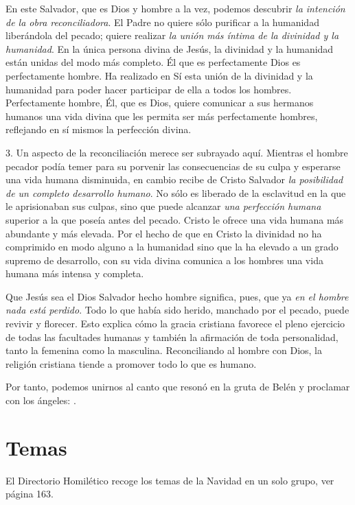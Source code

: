 \begin{body}
\begin{body}
En este Salvador, que es Dios y hombre a la vez, podemos descubrir \emph{la intención de la obra reconciliadora}. El Padre no quiere sólo purificar a la humanidad liberándola del pecado; quiere realizar \emph{la unión más íntima de la divinidad y la humanidad}. En la única persona divina de Jesús, la divinidad y la humanidad están unidas del modo más completo. Él que es perfectamente Dios es perfectamente hombre. Ha realizado en Sí esta unión de la divinidad y la humanidad para poder hacer participar de ella a todos los hombres. Perfectamente hombre, Él, que es Dios, quiere comunicar a sus hermanos humanos una vida divina que les permita ser más perfectamente hombres, reflejando en sí mismos la perfección divina.

3. Un aspecto de la reconciliación merece ser subrayado aquí. Mientras el hombre pecador podía temer para su porvenir las consecuencias de su culpa y esperarse una vida humana disminuida, en cambio recibe de Cristo Salvador \emph{la posibilidad de un completo desarrollo humano}. No sólo es liberado de la esclavitud en la que le aprisionaban sus culpas, sino que puede alcanzar \emph{una perfección humana} superior a la que poseía antes del pecado. Cristo le ofrece una vida humana más abundante y más elevada. Por el hecho de que en Cristo la divinidad no ha comprimido en modo alguno a la humanidad sino que la ha elevado a un grado supremo de desarrollo, con su vida divina comunica a los hombres una vida humana más intensa y completa.

Que Jesús sea el Dios Salvador hecho hombre significa, pues, que ya \emph{en el hombre nada está perdido}. Todo lo que había sido herido, manchado por el pecado, puede revivir y florecer. Esto explica cómo la gracia cristiana favorece el pleno ejercicio de todas las facultades humanas y también la afirmación de toda personalidad, tanto la femenina como la masculina. Reconciliando al hombre con Dios, la religión cristiana tiende a promover todo lo que es humano.

Por tanto, podemos unirnos al canto que resonó en la gruta de Belén y proclamar con los ángeles: .


\section{Temas}

El Directorio Homilético recoge los temas de la Navidad en un solo
grupo, ver página 163.


\end{body}
\end{body}
